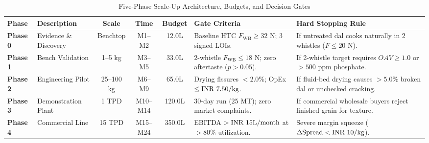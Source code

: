 \documentclass[10pt,a4paper]{article}
\newcommand{\inr}{\text{INR~}}
\begin{document}
\begin{table}[H]
\centering
\small
\caption{Five-Phase Scale-Up Architecture, Budgets, and Decision Gates}
\label{tab:scaleup_phases}
\begin{tabularx}{\linewidth}{lp{2.2cm}cccXX}
\toprule
\textbf{Phase} & \textbf{Description} & \textbf{Scale} & \textbf{Time} & \textbf{Budget} & \textbf{Gate Criteria} & \textbf{Hard Stopping Rule} \\
\midrule
\textbf{Phase 0} & Evidence \& Discovery & Benchtop & M1--M2 & \inr 12.0L & Baseline HTC $F_{\mathrm{WB}} \ge 32\text{ N}$; 3 signed LOIs. & If untreated dal cooks naturally in 2 whistles ($F \le 20\text{ N}$). \\
\textbf{Phase 1} & Bench Validation & 1--5 kg & M3--M5 & \inr 33.0L & 2-whistle $F_{\mathrm{WB}} \le 18\text{ N}$; zero aftertaste ($p > 0.05$). & If 2-whistle target requires $OAV \ge 1.0$ or $> 500\text{ ppm}$ phosphate. \\
\textbf{Phase 2} & Engineering Pilot & 25--100 kg & M6--M9 & \inr 65.0L & Drying fissures $< 2.0\%$; OpEx $\le \text{\inr } 7.50/\text{kg}$. & If fluid-bed drying causes $> 5.0\%$ broken dal or unchecked cracking. \\
\textbf{Phase 3} & Demonstration Plant & 1 TPD & M10--M14 & \inr 120.0L & 30-day run (25 MT); zero market complaints. & If commercial wholesale buyers reject finished grain for texture. \\
\textbf{Phase 4} & Commercial Line & 15 TPD & M15--M24 & \inr 350.0L & EBITDA $> \text{\inr } 15\text{L/month}$ at $> 80\%$ utilization. & Severe margin squeeze ($\Delta \text{Spread} < \text{\inr } 10/\text{kg}$). \\
\bottomrule
\end{tabularx}
\end{table}
\end{document}
